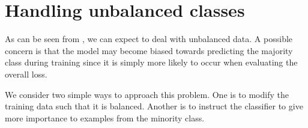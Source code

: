 \documentclass[
	fontsize=10pt, %
	twoside=false, %
	secnumdepth=1, %
  toc=indentunnumbered %
]{kaobook}
\begin{document}
\section{Handling unbalanced classes}





As can be seen from , we can expect to deal with unbalanced
data. 
A possible concern is that the model may become biased towards predicting
the majority class during training since it is simply more likely to occur when
evaluating the overall loss.

We consider two simple ways to approach this problem. One is to modify the
training data such that it is balanced. Another is to instruct the classifier to
give more importance to examples from the minority class.


\end{document}

